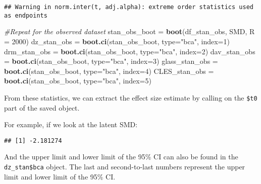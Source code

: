 \documentclass[]{tufte-handout}
\newenvironment{Shaded}{}{}
\newcommand{\CommentTok}[1]{\textcolor[rgb]{0.38,0.63,0.69}{\textit{#1}}}
\newcommand{\DataTypeTok}[1]{\textcolor[rgb]{0.56,0.13,0.00}{#1}}
\newcommand{\DecValTok}[1]{\textcolor[rgb]{0.25,0.63,0.44}{#1}}
\newcommand{\KeywordTok}[1]{\textcolor[rgb]{0.00,0.44,0.13}{\textbf{#1}}}
\newcommand{\NormalTok}[1]{#1}
\newcommand{\OperatorTok}[1]{\textcolor[rgb]{0.40,0.40,0.40}{#1}}
\newcommand{\StringTok}[1]{\textcolor[rgb]{0.25,0.44,0.63}{#1}}
\begin{document}
\begin{verbatim}
## Warning in norm.inter(t, adj.alpha): extreme order statistics used as endpoints
\end{verbatim}

\begin{Shaded}
\begin{Highlighting}[]
\CommentTok{#Repeat for the observed dataset}
\NormalTok{stan_obs_boot =}\StringTok{ }\KeywordTok{boot}\NormalTok{(df_stan_obs, SMD, }\DataTypeTok{R =} \DecValTok{2000}\NormalTok{)}
\NormalTok{dz_stan_obs =}\StringTok{ }\KeywordTok{boot.ci}\NormalTok{(stan_obs_boot, }\DataTypeTok{type=}\StringTok{"bca"}\NormalTok{, }\DataTypeTok{index=}\DecValTok{1}\NormalTok{)}
\NormalTok{drm_stan_obs =}\StringTok{ }\KeywordTok{boot.ci}\NormalTok{(stan_obs_boot, }\DataTypeTok{type=}\StringTok{"bca"}\NormalTok{, }\DataTypeTok{index=}\DecValTok{2}\NormalTok{)}
\NormalTok{dav_stan_obs =}\StringTok{ }\KeywordTok{boot.ci}\NormalTok{(stan_obs_boot, }\DataTypeTok{type=}\StringTok{"bca"}\NormalTok{, }\DataTypeTok{index=}\DecValTok{3}\NormalTok{)}
\NormalTok{glass_stan_obs =}\StringTok{ }\KeywordTok{boot.ci}\NormalTok{(stan_obs_boot, }\DataTypeTok{type=}\StringTok{"bca"}\NormalTok{, }\DataTypeTok{index=}\DecValTok{4}\NormalTok{)}
\NormalTok{CLES_stan_obs =}\StringTok{ }\KeywordTok{boot.ci}\NormalTok{(stan_obs_boot, }\DataTypeTok{type=}\StringTok{"bca"}\NormalTok{, }\DataTypeTok{index=}\DecValTok{5}\NormalTok{)}
\end{Highlighting}
\end{Shaded}

From these statistics, we can extract the effect size estimate by
calling on the \texttt{\$t0} part of the saved object.

For example, if we look at the latent SMD:

\begin{Shaded}
\end{Shaded}

\begin{verbatim}
## [1] -2.181274
\end{verbatim}

And the upper limit and lower limit of the 95\% CI can also be found in
the \texttt{dz\_stan\$bca} object. The last and second-to-last numbers
represent the upper limit and lower limit of the 95\% CI.

\begin{Shaded}
\end{Shaded}
\end{document}
